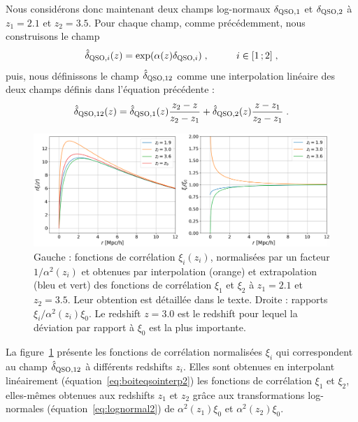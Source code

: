 Nous considérons donc maintenant deux champs log-normaux $\delta_{\textsc{QSO},1}$ et $\delta_{\textsc{QSO},2}$ à $z_1 = \num{2.1}$ et $z_2 = \num{3.5}$. Pour chaque champ, comme précédemment, nous construisons le champ
\begin{equation}
  \label{eq:boiteqsointerp1}
  \hat  \delta_{\textsc{QSO}, i}(z) = \exp(\alpha(z) \delta_{\textsc{QSO},i}) \; ,
  \hspace{1cm} i \in [1\, ; 2] \; ,
\end{equation}
puis, nous définissons le champ $\hat \delta_{\textsc{QSO}, 12}$ comme une interpolation linéaire des deux champs définis dans l'équation précédente :
\begin{equation}
  \label{eq:boiteqsointerp2}
  \hat \delta_{\textsc{QSO}, 12}(z) = \hat \delta_{\textsc{QSO}, 1}(z) \frac{z_2 - z}{z_2 - z_1} + \hat \delta_{\textsc{QSO}, 2}(z) \frac{z - z_1}{z_2 - z_1} \; .
\end{equation}
\begin{figure}
  \centering
  \includegraphics[scale=0.4]{qsolognormal2}
  \caption{Gauche : fonctions de corrélation $\xi_{i}(z_i)$, normalisées par un facteur $1 / \alpha^2(z_i)$ et obtenues par interpolation (orange) et extrapolation (bleu et vert) des fonctions de corrélation $\xi_1$ et $\xi_2$ à $z_1 = \num{2.1}$ et $z_2 = \num{3.5}$. Leur obtention est détaillée dans le texte. Droite : rapports $\xi_i / \alpha^2(z_i) \xi_0$. Le redshift $z = \num{3.0}$ est le redshift pour lequel la déviation par rapport à $\xi_0$ est la plus importante.}
  \label{fig:qsolognormal2}
\end{figure}
La figure~\ref{fig:qsolognormal2} présente les fonctions de corrélation normalisées $\xi_i$ qui correspondent au champ $\hat \delta_{\textsc{QSO},12}$ à différents redshifts $z_i$. Elles sont obtenues en interpolant linéairement (équation~\ref{eq:boiteqsointerp2}) les fonctions de corrélation $\xi_1$ et $\xi_2$, elles-mêmes obtenues aux redshifts $z_1$ et $z_2$ grâce aux transformations log-normales (équation~\ref{eq:lognormal2}) de $\alpha^2(z_1)\xi_0$ et $\alpha^2(z_2)\xi_0$.
